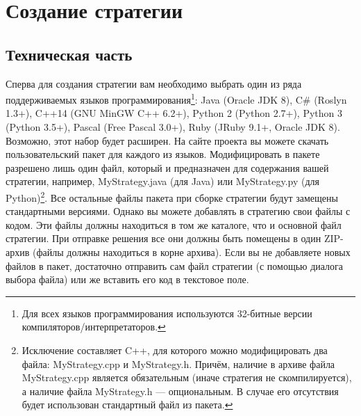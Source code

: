 \chapter{Создание стратегии}

\section{Техническая часть}

Сперва для создания стратегии вам необходимо выбрать один из ряда поддерживаемых языков программирования\footnote[4]{Для всех языков
программирования используются 32-битные версии компиляторов/интерпретаторов.}: Java (Oracle JDK 8), C\# (Roslyn 1.3+), C++14 (GNU MinGW C++
6.2+), Python 2 (Python 2.7+), Python 3 (Python 3.5+), Pascal (Free Pascal 3.0+), Ruby (JRuby 9.1+, Oracle JDK 8). Возможно, этот набор
будет расширен. На сайте проекта вы можете скачать пользовательский пакет для каждого из языков. Модифицировать в пакете разрешено лишь один
файл, который и предназначен для содержания вашей стратегии, например, MyStrategy.java (для Java) или MyStrategy.py (для
Python)\footnote[5]{Исключение составляет C++, для которого можно модифицировать два файла: MyStrategy.cpp и MyStrategy.h. Причём, наличие
в архиве файла MyStrategy.cpp является обязательным (иначе стратегия не скомпилируется), а наличие файла MyStrategy.h --- опциональным. В
случае его отсутствия будет использован стандартный файл из пакета.}. Все остальные файлы пакета при сборке стратегии будут замещены
стандартными версиями. Однако вы можете добавлять в стратегию свои файлы с кодом. Эти файлы должны находиться в том же каталоге, что и
основной файл стратегии. При отправке решения все они должны быть помещены в один ZIP-архив (файлы должны находиться в корне архива). Если
вы не добавляете новых файлов в пакет, достаточно отправить сам файл стратегии (с помощью диалога выбора файла) или же вставить его код в
текстовое поле.


